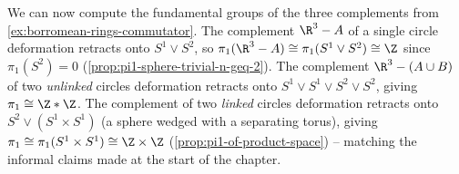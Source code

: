 \begin{example}
\label{ex:linking-of-circles-fundamental-groups}
We can now compute the fundamental groups of the three complements from
\cref{ex:borromean-rings-commutator}. The complement $\R^3-A$ of a single circle
deformation retracts onto $S^1\vee S^2$, so $\pi_1(\R^3-A) \cong \pi_1(S^1\vee S^2) \cong \Z$
since $\pi_1(S^2)=0$ (\cref{prop:pi1-sphere-trivial-n-geq-2}). The complement
$\R^3-(A\cup B)$ of two \emph{unlinked} circles deformation retracts onto
$S^1\vee S^1\vee S^2\vee S^2$, giving $\pi_1 \cong \Z*\Z$. The complement of two
\emph{linked} circles deformation retracts onto $S^2 \vee (S^1\times S^1)$ (a sphere
wedged with a separating torus), giving
$\pi_1 \cong \pi_1(S^1\times S^1) \cong \Z\times\Z$ (\cref{prop:pi1-of-product-space}) --
matching the informal claims made at the start of the chapter.


\end{example}


